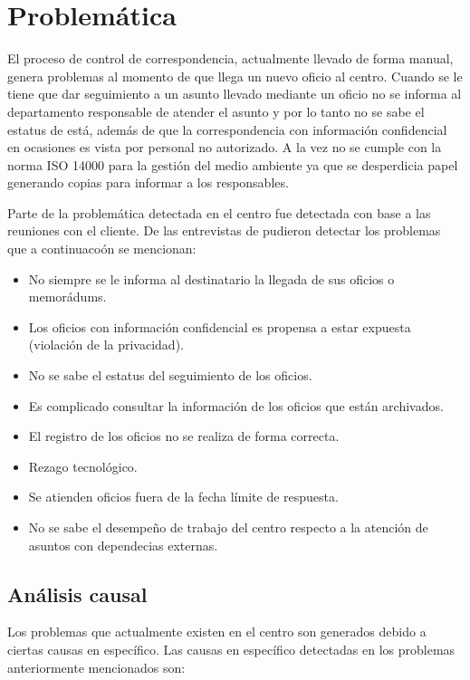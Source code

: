 \section{Problemática}

El proceso de control de correspondencia, actualmente llevado de forma manual, genera problemas al momento de que llega un nuevo oficio al centro. Cuando se le tiene que dar seguimiento a un asunto llevado mediante un oficio no se informa al departamento responsable de atender el asunto y por lo tanto no se sabe el estatus de está, además de que la correspondencia con información confidencial en ocasiones es vista por personal no autorizado. A la vez no se cumple con la norma ISO 14000 para la gestión del medio ambiente ya que se desperdicia papel generando copias para informar a los responsables.

Parte de la problemática detectada en el centro fue detectada con base a las reuniones con el cliente. De las entrevistas de pudieron detectar los problemas que a continuacoón se mencionan:

\begin{itemize}
	
	\item No siempre se le informa al destinatario la llegada de sus oficios o memorádums.
	\item Los oficios con información confidencial es propensa a estar expuesta (violación de la privacidad).
	\item No se sabe el estatus del seguimiento de los oficios.
	\item Es complicado consultar la información de los oficios que están archivados.
	\item El registro de los oficios no se realiza de forma correcta.
	\item Rezago tecnológico.
	\item Se atienden oficios fuera de la fecha límite de respuesta.
	\item No se sabe el desempeño de trabajo del centro respecto a la atención de asuntos con dependecias externas.
	
\end{itemize}

\subsection{Análisis causal}

Los problemas que actualmente existen en el centro son generados debido a ciertas causas en específico. Las causas en específico detectadas en los problemas anteriormente mencionados son:

